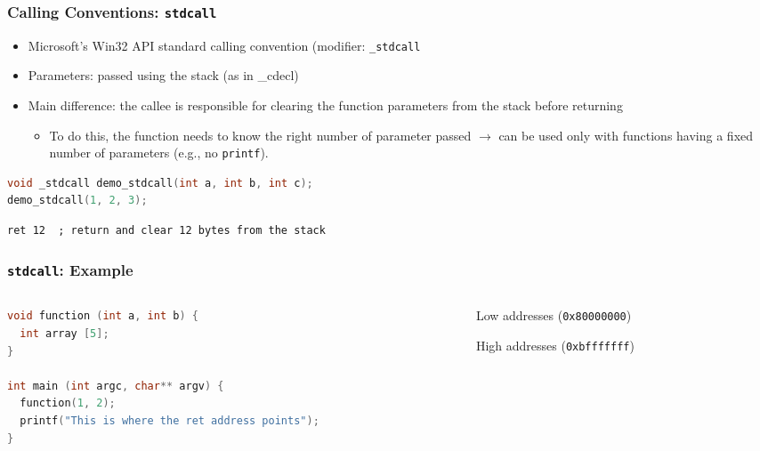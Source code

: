 \documentclass[]{beamer}
\begin{document}
\begin{frame}[fragile]
  \frametitle{Calling Conventions: {\tt stdcall}}
  \begin{itemize}
  \item Microsoft's Win32 API standard calling convention (modifier: \alert{\tt \_stdcall}
  \item Parameters: passed using the stack (as in \_cdecl)
  \item Main difference: the callee is responsible for clearing the function parameters from the stack before returning
  \begin{itemize}
  \item To do this, the function needs to know the right number of parameter passed $\rightarrow$ can be used only with functions having a fixed number of parameters (e.g., no \texttt{printf}).
  \end{itemize}
  \end{itemize}

\begin{lstlisting}[language=C]
void _stdcall demo_stdcall(int a, int b, int c);
demo_stdcall(1, 2, 3);
\end{lstlisting}
\begin{lstlisting}[language={[x86masm]Assembler}]
ret 12  ; return and clear 12 bytes from the stack
\end{lstlisting}
\end{frame}

\begin{frame}[fragile]
  \frametitle{{\tt stdcall}: Example}
  \begin{columns}
    \begin{column}{.5\textwidth}
\begin{lstlisting}[language=C]
void function (int a, int b) {
  int array [5];
}

int main (int argc, char** argv) {
  function(1, 2);
  printf("This is where the ret address points");
}
\end{lstlisting}
    \end{column}
    \begin{column}{.5\textwidth}
    	\centering
    	\par{\scriptsize Low addresses ({\tt 0x80000000})}\\[.5em]
	\begin{drawstack}[scale=0.7, font=\footnotesize]
	\startframe
	\end{drawstack}
	\par{\scriptsize High addresses ({\tt 0xbfffffff})}
     \end{column}
  \end{columns}
\end{frame}
\end{document}
